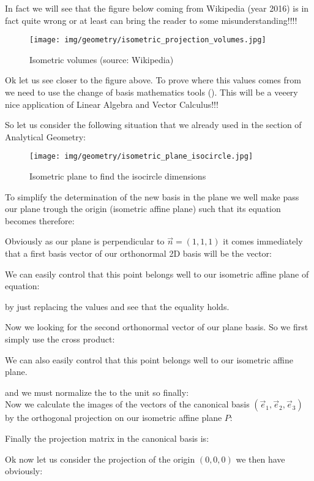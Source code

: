 	In fact we will see that the figure below coming from Wikipedia (year 2016) is in fact quite wrong or at least can bring the reader to some misunderstanding!!!!
	
	\begin{figure}[H]
		\centering
		\texttt{[image: img/geometry/isometric\_projection\_volumes.jpg]}
		\caption{Isometric volumes (source: Wikipedia)}
	\end{figure}
	Ok let us see closer to the figure above. To prove where this values comes from we need to use the change of basis mathematics tools (). This will be a veeery nice application of Linear Algebra and Vector Calculus!!!
	
	So let us consider the following situation that we already used in the section of Analytical Geometry:
	\begin{figure}[H]
		\centering
		\texttt{[image: img/geometry/isometric\_plane\_isocircle.jpg]}
		\caption{Isometric plane to find the isocircle dimensions}
	\end{figure}	
	To simplify the determination of the new basis in the plane we well make pass our plane trough the origin (isometric affine plane) such that its equation becomes therefore:
	

	Obviously as our plane is perpendicular to $\vec{n}=(1,1,1)$ it comes immediately that a first basis vector of our orthonormal 2D basis will be the vector:
	
	We can easily control that this point belongs well to our isometric affine plane of equation:
	
	by just replacing the values and see that the equality holds.

		Now we looking for the second orthonormal vector of our plane basis. So we first simply use the cross product:
	
	We can also easily control that this point belongs well to our isometric affine plane.
	
	and we must normalize the to the unit so finally:\\
	
	Now we calculate the images of the vectors of the canonical basis $(\vec{e}_1,\vec{e}_2,\vec{e}_3)$ by the orthogonal projection on our isometric affine plane $P$:
	
	Finally the projection matrix in the canonical basis is:
	
	Ok now let us consider the projection of the origin $(0,0,0)$ we then have obviously:
	
